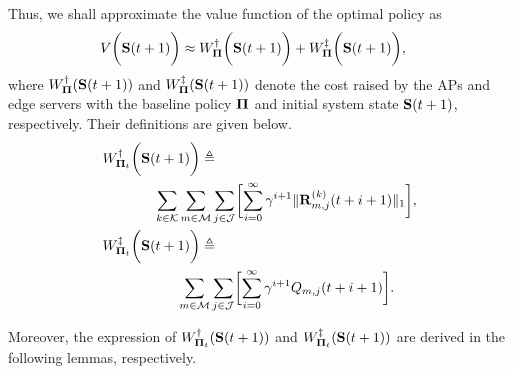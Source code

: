 Thus, we shall approximate the value function of the optimal policy as
\begin{align}
    &V\bigg(\mathbf{S}(t+1)\bigg) \approx
    W^{\dagger}_{\boldsymbol{\Pi}} \bigg(\mathbf{S}(t+1)\bigg) +
    W^{\ddagger}_{\boldsymbol{\Pi}} \bigg(\mathbf{S}(t+1)\bigg),
\end{align}
where $W^{\dagger}_{\boldsymbol{\Pi}}(\mathbf{S}(t+1))$ and $W^{\ddagger}_{\boldsymbol{\Pi}}(\mathbf{S}(t+1))$ denote the cost raised by the APs and edge servers with the baseline policy $\boldsymbol{\Pi}$ and initial system state $\mathbf{S}(t+1)$, respectively.
Their definitions are given below.
\begin{align}
    &W^{\dagger}_{\Baseline_{t}} \Paren{\Stat(t+1)} \define
    \nonumber\\
    &~~~~~~~~~~~\sum_{k\in\apSet}\sum_{m\in\esSet}\sum_{j\in\jSpace}\Bracket{
        \sum_{i=0}^{\infty} \gamma^{i+1} \Inorm{\vec{R}^{(k)}_{m,j}(t+i+1)}
    },
    \\    
    &W^{\ddagger}_{\Baseline_{t}}\Paren{\Stat(t+1)} \define
    \nonumber\\
    &~~~~~~~~~~~~~~~~\sum_{m\in\esSet}\sum_{j\in\jSpace}\Bracket{
        \sum_{i=0}^{\infty} \gamma^{i+1} Q_{m,j}(t+i+1)
    }.
\end{align}

Moreover, the expression of $W^{\dagger}_{\boldsymbol{\Pi}_{t}}(\mathbf{S}(t+1))$ and $W^{\ddagger}_{\boldsymbol{\Pi}_{t}}(\mathbf{S}(t+1))$ are derived in the following lemmas, respectively.

